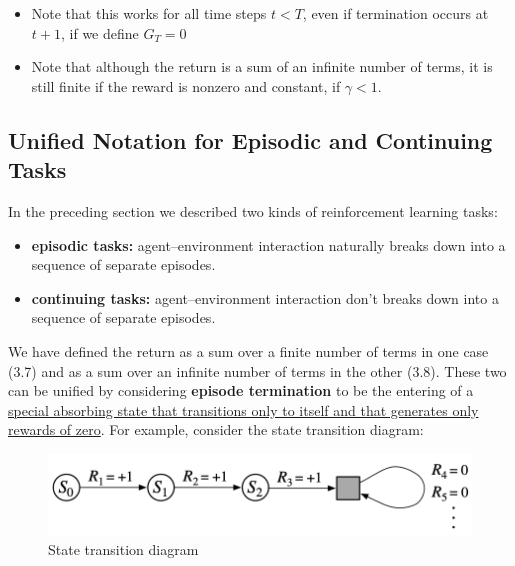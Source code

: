 \documentclass[12pt, a4paper]{article}
\begin{document}
\begin{itemize}
\item
  Note that this works for all time steps \(t<T\), even if termination
  occurs at \(t + 1\), if we define \(G_T = 0\)
\item
  Note that although the return is a sum of an infinite number of terms,
  it is still finite if the reward is nonzero and constant, if
  \(\gamma < 1\).
\end{itemize}






\subsection{Unified Notation for Episodic and Continuing Tasks}
\label{unified-notation-for-episodic-and-continuing-tasks}

In the preceding section we described two kinds of reinforcement
learning tasks:

\begin{itemize}
\item
  \textbf{episodic tasks:} agent--environment interaction naturally
  breaks down into a sequence of separate episodes.
\item
  \textbf{continuing tasks:} agent--environment interaction don't breaks
  down into a sequence of separate episodes.
\end{itemize}

We have defined the return as a sum over a finite number of terms in one
case (3.7) and as a sum over an infinite number of terms in the other
(3.8). These two can be unified by considering \textbf{episode
termination} to be the entering of a \uline{special absorbing state that
transitions only to itself and that generates only rewards of zero}. For
example, consider the state transition diagram:


\begin{figure}[H]
  \centering  %
    \includegraphics[width=0.9\columnwidth]{images/Unified-Notation-Episodic-and-Continuing-Tasks.png}
    \caption{State transition diagram}
    \label{fig:fig4}
\end{figure}
\end{document}
